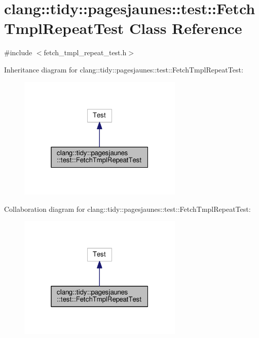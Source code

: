 \hypertarget{classclang_1_1tidy_1_1pagesjaunes_1_1test_1_1_fetch_tmpl_repeat_test}{}\section{clang\+:\+:tidy\+:\+:pagesjaunes\+:\+:test\+:\+:Fetch\+Tmpl\+Repeat\+Test Class Reference}
\label{classclang_1_1tidy_1_1pagesjaunes_1_1test_1_1_fetch_tmpl_repeat_test}


{\ttfamily \#include $<$fetch\+\_\+tmpl\+\_\+repeat\+\_\+test.\+h$>$}



Inheritance diagram for clang\+:\+:tidy\+:\+:pagesjaunes\+:\+:test\+:\+:Fetch\+Tmpl\+Repeat\+Test\+:
\nopagebreak
\begin{figure}[H]
\begin{center}
\leavevmode
\includegraphics[width=223pt]{classclang_1_1tidy_1_1pagesjaunes_1_1test_1_1_fetch_tmpl_repeat_test__inherit__graph}
\end{center}
\end{figure}


Collaboration diagram for clang\+:\+:tidy\+:\+:pagesjaunes\+:\+:test\+:\+:Fetch\+Tmpl\+Repeat\+Test\+:
\nopagebreak
\begin{figure}[H]
\begin{center}
\leavevmode
\includegraphics[width=223pt]{classclang_1_1tidy_1_1pagesjaunes_1_1test_1_1_fetch_tmpl_repeat_test__coll__graph}
\end{center}
\end{figure}
